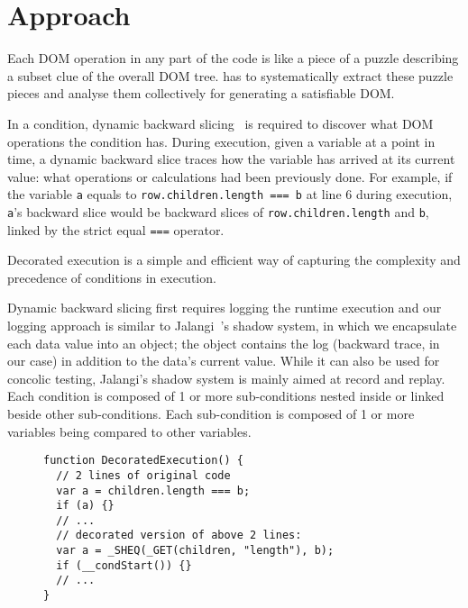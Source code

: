 \section{Approach}
Each DOM operation in any part of the code is like a piece of a puzzle describing a subset clue of the overall DOM tree.  \tool has to systematically extract these puzzle pieces and analyse them collectively for generating a satisfiable DOM.  

In a condition, dynamic backward slicing~\cite{} is required to discover what DOM operations the condition has.  
During execution, given a variable at a point in time, a dynamic backward slice traces how the variable has arrived at its current value: what operations or calculations had been previously done.  
For example, if the variable {\tt a} equals to {\tt row.children.length === b} at line 6 during execution, {\tt a}'s backward slice would be backward slices of {\tt row.children.length} and {\tt b}, linked by the strict equal {\tt ===} operator.  

Decorated execution is a simple and efficient way of capturing the complexity and precedence of conditions in execution.  

Dynamic backward slicing first requires logging the runtime execution and our logging approach is similar to Jalangi~\cite{jalangi}'s shadow system, in which we encapsulate each data value into an object; the object contains the log (backward trace, in our case) in addition to the data’s current value. While it can also be used for concolic testing, Jalangi’s shadow system is mainly aimed at record and replay.  
Each condition is composed of 1 or more sub-conditions nested inside or linked beside other sub-conditions.  Each sub-condition is composed of 1 or more variables being compared to other variables.  

\begin{figure}
\begin{lstlisting}[caption=Example showing how code is decorated for logging execution and using the trace to construct a dynamic backward slice,label=decorated]  
function DecoratedExecution() {
  // 2 lines of original code
  var a = children.length === b; 
  if (a) {}
  // ...
  // decorated version of above 2 lines:
  var a = _SHEQ(_GET(children, "length"), b);
  if (__condStart()) {}
  // ...
}
\end{lstlisting}
\end{figure}













